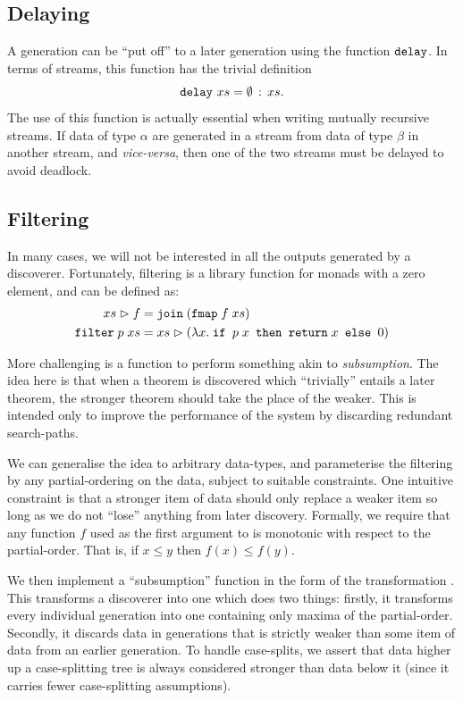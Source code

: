 \subsection{Delaying}
A generation can be ``put off'' to a later generation using the function $\texttt{delay}$. In terms of streams, this function has the trivial definition
\begin{displaymath}
  \texttt{delay}\ xs = \emptyset\,:\,xs.
\end{displaymath}
The use of this function is actually essential when writing mutually recursive streams. If data of type $\alpha$ are generated in a stream from data of type $\beta$ in another stream, and \emph{vice-versa}, then one of the two streams must be delayed to avoid deadlock.

\subsection{Filtering}\label{sec:Filtering}
In many cases, we will not be interested in all the outputs generated by a discoverer. Fortunately, filtering is a library function for monads with a zero element, and can be defined as:
\begin{align*}
xs \vartriangleright f &= \texttt{join}\;(\texttt{fmap}\;f\;xs) \\
\texttt{filter}\;p\;xs &= xs \vartriangleright (\lambda x.\;\texttt{if } p\;x \texttt{ then } \texttt{return}\;x \texttt { else } 0)
\end{align*}

More challenging is a function to perform something akin to \emph{subsumption}. The idea here is that when a theorem is discovered which ``trivially'' entails a later theorem, the stronger theorem should take the place of the weaker. This is intended only to improve the performance of the system by discarding redundant search-paths. 

We can generalise the idea to arbitrary data-types, and parameterise the filtering by any partial-ordering on the data, subject to suitable constraints. One intuitive constraint is that a stronger item of data should only replace a weaker item so long as we do not ``lose'' anything from later discovery. Formally, we require that any function $f$ used as the first argument to  is monotonic with respect to the partial-order. That is, if $x \leq y$ then $f(x) \leq f(y)$. 

We then implement a ``subsumption'' function in the form of the transformation . This transforms a discoverer into one which does two things: firstly, it transforms every individual generation into one containing only maxima of the partial-order. Secondly, it discards data in generations that is strictly weaker than some item of data from an earlier generation. To handle case-splits, we assert that data higher up a case-splitting tree is always considered stronger than data below it (since it carries fewer case-splitting assumptions).

